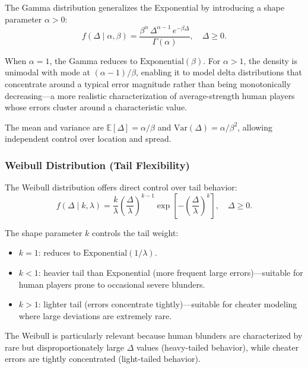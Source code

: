 \documentclass[11pt,a4paper]{article}
\newcommand{\E}{\mathbb{E}}
\begin{document}
The Gamma distribution generalizes the Exponential by introducing a shape
parameter $\alpha > 0$:
\begin{equation}
    f(\Delta \mid \alpha, \beta) = \frac{\beta^{\alpha}\,
    \Delta^{\alpha - 1}\, e^{-\beta\Delta}}{\Gamma(\alpha)},
    \quad \Delta \geq 0.
    \label{eq:gamma_pdf}
\end{equation}

When $\alpha = 1$, the Gamma reduces to $\text{Exponential}(\beta)$.
For $\alpha > 1$, the density is unimodal with mode at
$(\alpha - 1)/\beta$, enabling it to model delta distributions that
concentrate around a typical error magnitude rather than being monotonically
decreasing---a more realistic characterization of average-strength human
players whose errors cluster around a characteristic value.

The mean and variance are $\E[\Delta] = \alpha/\beta$ and
$\text{Var}(\Delta) = \alpha/\beta^2$, allowing independent control over
location and spread.

\subsubsection{Weibull Distribution (Tail Flexibility)}

The Weibull distribution offers direct control over tail behavior:
\begin{equation}
    f(\Delta \mid k, \lambda) = \frac{k}{\lambda}
    \left(\frac{\Delta}{\lambda}\right)^{k-1}
    \exp\!\left[-\left(\frac{\Delta}{\lambda}\right)^{k}\right],
    \quad \Delta \geq 0.
    \label{eq:weibull_pdf}
\end{equation}

The shape parameter $k$ controls the tail weight:
\begin{itemize}
    \item $k = 1$: reduces to $\text{Exponential}(1/\lambda)$.
    \item $k < 1$: heavier tail than Exponential (more frequent large
          errors)---suitable for human players prone to occasional severe
          blunders.
    \item $k > 1$: lighter tail (errors concentrate tightly)---suitable for
          cheater modeling where large deviations are extremely rare.
\end{itemize}

The Weibull is particularly relevant because human blunders are characterized
by rare but disproportionately large $\Delta$ values (heavy-tailed behavior),
while cheater errors are tightly concentrated (light-tailed behavior).
\end{document}
